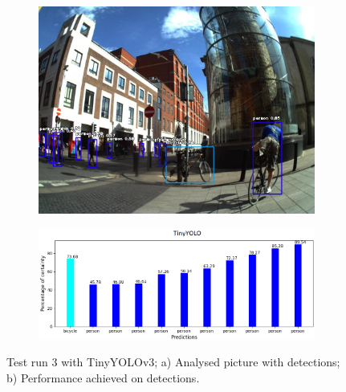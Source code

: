           \begin{figure}[H]
            \centering
            \captionsetup{justification=centering}
    
            \begin{subfigure}{0.29\textwidth}
            \includegraphics[width=\textwidth]{Sections/4InitialWork/4_images_obj_run4/yolo_tiny.jpg} 
            \caption{}
            \end{subfigure}
            \begin{subfigure}{0.65\textwidth}
            \includegraphics[width=\textwidth]{Sections/4InitialWork/4_images_obj_run4/tiny_yolo_graph.png}
            \caption{}
            \end{subfigure}
            
            \caption[Test run 3 with TinyYOLOv3]{ 
            Test run 3 with TinyYOLOv3; a) Analysed picture with detections; b) Performance achieved on detections. }
            \label{fig:tiny_3}
            \end{figure}


    \newpage

